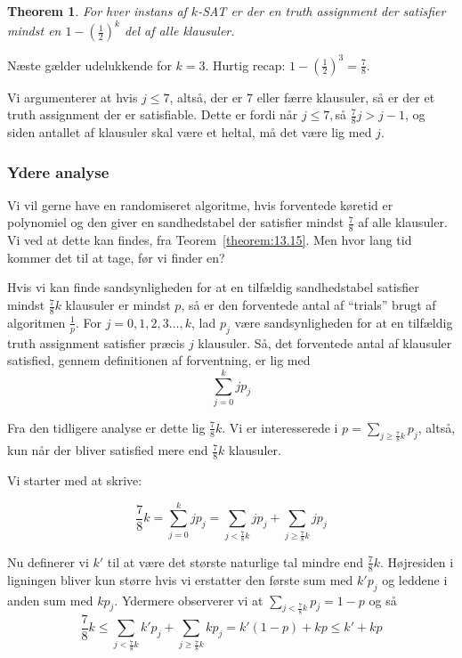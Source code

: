 \documentclass[11pt]{article}
\newtheorem{theorem}{Theorem}
\theoremstyle{definition}
\theoremstyle{remark}
\begin{document}
\begin{theorem}
For hver instans af $k$-SAT er der en truth assignment der satisfier mindst en $1 - \left ( \frac{1}{2} \right )^{k}$ del af alle klausuler.
\end{theorem}

Næste gælder udelukkende for $k = 3$. Hurtig recap: $1 - \left( \frac{1}{2} \right)^{3} = \frac{7}{8}$.

Vi argumenterer at hvis $j \leq 7$, altså, der er 7 eller færre klausuler, så er der et truth assignment der er satisfiable. Dette er fordi når $j \leq 7, $så $\frac{7}{8}j > j - 1$, og siden antallet af klausuler skal være et heltal, må det være lig med $j$.

\subsubsection{Ydere analyse}

Vi vil gerne have en randomiseret algoritme, hvis forventede køretid er polynomiel og den giver en sandhedstabel der satisfier mindst $\frac{7}{8}$ af alle klausuler.
Vi ved at dette kan findes, fra Teorem~\ref{theorem:13.15}. Men hvor lang tid kommer det til at tage, før vi finder en? 

Hvis vi kan finde sandsynligheden for at en tilfældig sandhedstabel satisfier mindst $\frac{7}{8}k$ klausuler er mindst $p$, så er den forventede antal af ``trials'' brugt af algoritmen $\frac{1}{p}$.
For $j = 0, 1, 2, 3\ldots, k$, lad $p_{j}$ være sandsynligheden for at en tilfældig truth assignment satisfier præcis $j$ klausuler. Så, det forventede antal af klausuler satisfied, gennem definitionen af forventning, er lig med \[
\sum_{j=0}^{k}j p_{j}
\]

Fra den tidligere analyse er dette lig $\frac{7}{8}k$.
Vi er interesserede i $p = \sum_{j \geq \frac{7}{8}k}^{}p_{j}$, altså, kun når der bliver satisfied mere end $\frac{7}{8}k$ klausuler.

Vi starter med at skrive:

\[
\frac{7}{8}k = \sum_{j=0}^{k}jp_{j} = \sum_{j < \frac{7}{8}k}^{} jp_{j} + \sum_{j \geq \frac{7}{8}k}^{} j p_{j}
\]

Nu definerer vi $k'$ til at være det største naturlige tal mindre end $\frac{7}{8}k$. Højresiden i ligningen bliver kun større hvis vi erstatter den første sum med $k'p_{j}$ og leddene i anden sum med $kp_{j}$. Ydermere observerer vi at $\sum_{j < \frac{7}{8}k}^{}p_{j} = 1 - p$ og så
\[
\frac{7}{8}k \leq \sum_{j < \frac{7}{8}k}^{} k'p_{j} + \sum_{j \geq \frac{7}{8}k}^{}kp_{j} = k'(1-p)+kp \leq k' + kp
\]
\end{document}
